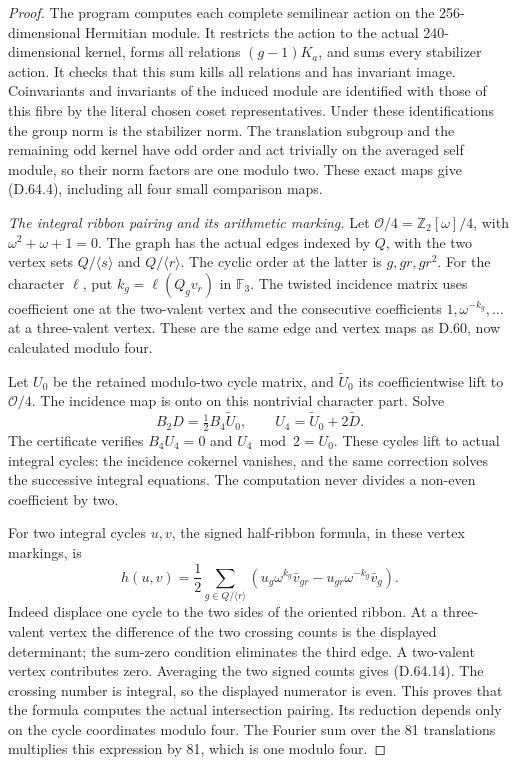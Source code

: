 \begin{proof}
The program 
computes each complete semilinear action on the
256-dimensional Hermitian module. It restricts
the action to the actual 240-dimensional kernel,
forms all relations \((g-1)K_a\), and sums every
stabilizer action. It checks that this sum kills
all relations and has invariant image.
Coinvariants and invariants of the induced module
are identified with those of this fibre by the
literal chosen coset representatives. Under these
identifications the group norm is the stabilizer
norm. The translation subgroup and the remaining
odd kernel have odd order and act trivially on
the averaged self module, so their norm factors
are one modulo two. These exact maps give
(D.64.4), including all four small comparison maps.

\emph{The integral ribbon pairing and its arithmetic marking.}
Let \(\mathcal O/4=\mathbb Z_2[\omega]/4\), with
\(\omega^2+\omega+1=0\). The graph has the actual
edges indexed by \(Q\), with the two vertex sets
\(Q/\langle s\rangle\) and \(Q/\langle r\rangle\).
The cyclic order at the latter is \(g,gr,gr^2\).
For the character \(\ell\), put
\(k_g=\ell(Q_gv_r)\) in \(\mathbb F_3\).
The twisted incidence matrix uses coefficient one
at the two-valent vertex and the consecutive
coefficients \(1,\omega^{-k_g},\ldots\) at a
three-valent vertex. These are the same edge and
vertex maps as D.60, now calculated modulo four.

Let \(U_0\) be the retained modulo-two cycle matrix,
and \(\widetilde U_0\) its coefficientwise lift to
\(\mathcal O/4\). The incidence map is onto on
this nontrivial character part. Solve
\[
 B_2D=\tfrac12 B_4\widetilde U_0,
 \qquad U_4=\widetilde U_0+2\widetilde D.
 \tag{D.64.13}
\]
The certificate verifies \(B_4U_4=0\) and
\(U_4\bmod2=U_0\). These cycles lift to actual
integral cycles: the incidence cokernel vanishes,
and the same correction solves the successive
integral equations. The computation never divides
a non-even coefficient by two.

For two integral cycles \(u,v\), the signed
half-ribbon formula, in these vertex markings, is
\[
 h(u,v)=\frac12\sum_{g\in Q/\langle r\rangle}
 \left(u_g\omega^{k_g}\bar v_{gr}
          -u_{gr}\omega^{-k_g}\bar v_g\right).
 \tag{D.64.14}
\]
Indeed displace one cycle to the two sides of the
oriented ribbon. At a three-valent vertex the
difference of the two crossing counts is the
displayed determinant; the sum-zero condition
eliminates the third edge. A two-valent vertex
contributes zero. Averaging the two signed counts
gives (D.64.14). The crossing number is integral,
so the displayed numerator is even. This proves
that the formula computes the actual intersection
pairing. Its reduction depends only on the cycle
coordinates modulo four. The Fourier sum over
the 81 translations multiplies this expression
by 81, which is one modulo four.


\end{proof}
